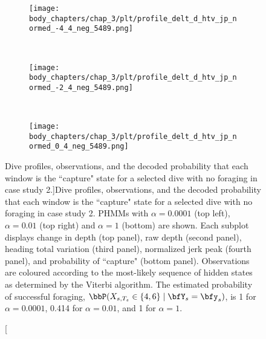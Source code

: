 \begin{figure}
    \centering
    \begin{subfigure}[t]{0.45\textwidth}
        \centering
        \texttt{[image: body\_chapters/chap\_3/plt/profile\_delt\_d\_htv\_jp\_normed\_-4\_4\_neg\_5489.png]}
    \end{subfigure}
    ~
    \begin{subfigure}[t]{0.45\textwidth}
        \centering
        \texttt{[image: body\_chapters/chap\_3/plt/profile\_delt\_d\_htv\_jp\_normed\_-2\_4\_neg\_5489.png]}
    \end{subfigure}
    \\
    \begin{subfigure}[t]{0.8\textwidth}
        \centering
        \texttt{[image: body\_chapters/chap\_3/plt/profile\_delt\_d\_htv\_jp\_normed\_0\_4\_neg\_5489.png]}
    \end{subfigure}
    \caption[Dive profiles, observations, and the decoded probability that each window is the ``capture" state for a selected dive with no foraging in case study 2.]{Dive profiles, observations, and the decoded probability that each window is the ``capture" state for a selected dive with no foraging in case study 2. PHMMs with $\alpha = 0.0001$ (top left), $\alpha = 0.01$ (top right) and $\alpha = 1$ (bottom) are shown. Each subplot displays change in depth (top panel), raw depth (second panel), heading total variation (third panel), normalized jerk peak (fourth panel), and probability of ``capture" (bottom panel). Observations are coloured according to the most-likely sequence of hidden states as determined by the Viterbi algorithm. The estimated probability of successful foraging, $\bbP(X_{s,T_s} \in \{4,6\} \mid \bfY_s = \bfy_s)$, is 1 for $\alpha = 0.0001$, 0.414 for $\alpha = 0.01$, and 1 for $\alpha = 1$.}
    \label{fig:profiles_5489}
\end{figure}

